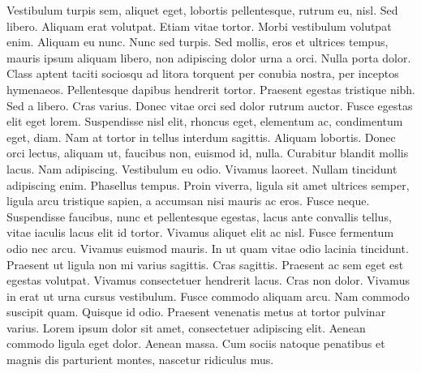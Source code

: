 Vestibulum turpis sem, aliquet eget, lobortis pellentesque, rutrum eu, nisl. Sed libero. Aliquam erat volutpat. Etiam vitae tortor. Morbi vestibulum volutpat enim. Aliquam eu nunc. Nunc sed turpis. Sed mollis, eros et ultrices tempus, mauris ipsum aliquam libero, non adipiscing dolor urna a orci. Nulla porta dolor. Class aptent taciti sociosqu ad litora torquent per conubia nostra, per inceptos hymenaeos. Pellentesque dapibus hendrerit tortor. Praesent egestas tristique nibh. Sed a libero. Cras varius. Donec vitae orci sed dolor rutrum auctor. Fusce egestas elit eget lorem. Suspendisse nisl elit, rhoncus eget, elementum ac, condimentum eget, diam. Nam at tortor in tellus interdum sagittis. Aliquam lobortis. Donec orci lectus, aliquam ut, faucibus non, euismod id, nulla. Curabitur blandit mollis lacus. Nam adipiscing. Vestibulum eu odio. Vivamus laoreet. Nullam tincidunt adipiscing enim. Phasellus tempus. Proin viverra, ligula sit amet ultrices semper, ligula arcu tristique sapien, a accumsan nisi mauris ac eros. Fusce neque. Suspendisse faucibus, nunc et pellentesque egestas, lacus ante convallis tellus, vitae iaculis lacus elit id tortor. Vivamus aliquet elit ac nisl. Fusce fermentum odio nec arcu. Vivamus euismod mauris. In ut quam vitae odio lacinia tincidunt. Praesent ut ligula non mi varius sagittis. Cras sagittis. Praesent ac sem eget est egestas volutpat. Vivamus consectetuer hendrerit lacus. Cras non dolor. Vivamus in erat ut urna cursus vestibulum. Fusce commodo aliquam arcu. Nam commodo suscipit quam. Quisque id odio. Praesent venenatis metus at tortor pulvinar varius. Lorem ipsum dolor sit amet, consectetuer adipiscing elit. Aenean commodo ligula eget dolor. Aenean massa. Cum sociis natoque penatibus et magnis dis parturient montes, nascetur ridiculus mus.

